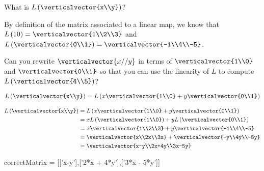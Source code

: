 \documentclass{ximera}
\begin{document}
\begin{question}
  
  What is $L\left(\verticalvector{x\\y}\right)$?

  \begin{solution}
  \begin{hint}
  		By definition of the matrix associated to a linear map, we know that $L\left(1\\0\right) = \verticalvector{1\\2\\3}$
  		and $L\left(\verticalvector{0\\1}\right) = \verticalvector{-1\\4\\-5}$.
  	\end{hint}
  	\begin{hint}
  		Can you rewrite $\verticalvector{x//y}$ in terms of $\verticalvector{1\\0}$ and $\verticalvector{0\\1}$ so that you can use the linearity
  		of $L$ to compute $L\left(\verticalvector{4\\5}\right)$?
  	\end{hint}
  	\begin{hint}
  		$L\left(\verticalvector{x\\y}\right) = L\left(x\verticalvector{1\\0}+y\verticalvector{0\\1}\right)$
  	\end{hint}
  	\begin{hint}
  		\begin{align*}
  		L\left(\verticalvector{x\\y}\right) &= L\left(x\verticalvector{1\\0}+y\verticalvector{0\\1}\right)\\
  		&= xL\left(\verticalvector{1\\0}\right)+yL\left(\verticalvector{0\\1}\right)\\
  		&=x\verticalvector{1\\2\\3}+y\verticalvector{-1\\4\\-5}\\
  		&=\verticalvector{x\\2x\\3x}+\verticalvector{-y\\4y\\-5y}\\
  		&=\verticalvector{x-y\\2x+4y\\3x-5y}
  		\end{align*}
  	\end{hint}
    \begin{matrix-answer}[name=w]
      correctMatrix = [['x-y'],['2*x + 4*y'],['3*x - 5*y']]
    \end{matrix-answer}          
  \end{solution}
\end{question}
\end{document}
